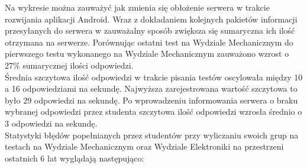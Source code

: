 \documentclass[eng]{mgr}
\begin{document}
		\begin{center}
		\end{center}
		
		Na wykresie można zauważyć jak zmienia się obłożenie serwera w trakcie rozwijania aplikacji Android. Wraz z dokładaniem kolejnych pakietów informacji przesyłanych do serwera w zauważalny sposób zwiększa się sumaryczna ich ilość otrzymana na serwerze. Porównując ostatni test na Wydziale Mechanicznym do pierwszego testu wykonanego na Wydziale Mechanicznym zauważono wzrost o 27\% sumarycznej ilości odpowiedzi.\\
		
		Średnia szczytowa ilość odpowiedzi w trakcie pisania testów oscylowała między 10 a 16 odpowiedziami na sekundę. Najwyższa zarejestrowana wartość szczytowa to było 29 odpowiedzi na sekundę. Po wprowadzeniu informowania serwera o braku wybranej odpowiedzi przez studenta szczytowa ilość odpowiedzi wzrosła średnio o 3 odpowiedzi na sekundę.\\
	
		Statystyki błędów popełnianych przez studentów przy wyliczaniu swoich grup na testach na Wydziale Mechanicznym oraz Wydziale Elektroniki na przestrzeni ostatnich 6 lat wyglądają następująco:
		
	
\end{document}
